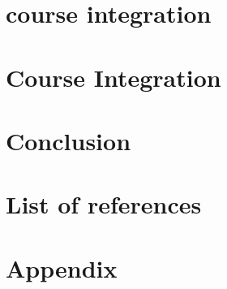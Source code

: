 \documentclass{article}
\begin{document}
\section{course integration}
\section{Course Integration}

\section{Conclusion}

\section{List of references}

\section{Appendix}
\end{document}
